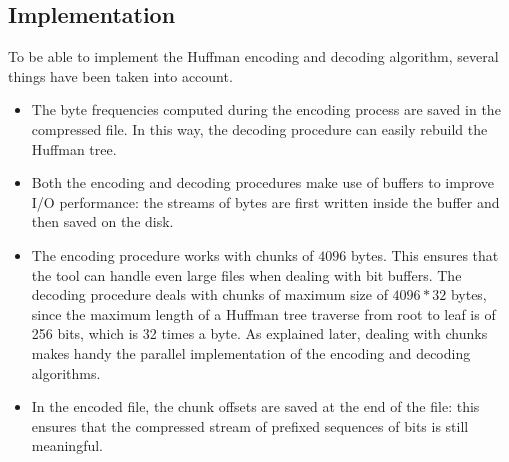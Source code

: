 \subsection{Implementation}
To be able to implement the Huffman encoding and decoding algorithm, several things have been taken into account.
\begin{itemize}
    \item The byte frequencies computed during the encoding process are saved in the compressed file. In this way, the decoding procedure can easily rebuild the Huffman tree.
    \item Both the encoding and decoding procedures make use of buffers to improve I/O performance: the streams of bytes are first written inside the buffer and then saved on the disk.
    \item The encoding procedure works with chunks of \(4096\) bytes. This ensures that the tool can handle even large files when dealing with bit buffers. The decoding procedure deals with chunks of maximum size of \(4096*32\) bytes, since the maximum length of a Huffman tree traverse from root to leaf is of 256 bits, which is 32 times a byte. As explained later, dealing with chunks makes handy the parallel implementation of the encoding and decoding algorithms.
    \item In the encoded file, the chunk offsets are saved at the end of the file: this ensures that the compressed stream of prefixed sequences of bits is still meaningful.
\end{itemize}

